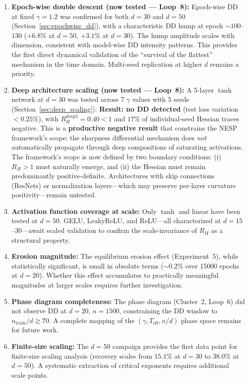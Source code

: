 \documentclass[
  journal=largetwo,
  simfonts=false,
  year=2025,
  volume=37,
]{cup-journal}
\begin{document}
\begin{enumerate}
    \item \textbf{Epoch-wise double descent (now tested --- Loop~8):} Epoch-wise DD at fixed $\gamma=1.2$ was confirmed for both $d=30$ and $d=50$ (Section~\ref{sec:epochwise_dd}), with a characteristic DD hump at epoch $\sim 100$--$130$ ($+6.8\%$ at $d=50$, $+3.1\%$ at $d=30$). The hump amplitude scales with dimension, consistent with model-wise DD intensity patterns. This provides the first direct dynamical validation of the ``survival of the flattest'' mechanism in the time domain. Multi-seed replication at higher $d$ remains a priority.

    \item \textbf{Deep architecture scaling (now tested --- Loop~8):} A 5-layer $\tanh$ network at $d=30$ was tested across 7 $\gamma$ values with 5 seeds (Section~\ref{sec:deep_scaling}). \textbf{Result: no DD detected} (test loss variation $<0.25\%$), with $R_H^{\mathrm{deep5}} = 0.40 < 1$ and $17\%$ of individual-seed Hessian traces negative. This is a \textbf{productive negative result} that constrains the NESP framework's scope: the sharpness differential mechanism does \emph{not} automatically propagate through deep compositions of saturating activations. The framework's scope is now defined by two boundary conditions: (i) $R_H > 1$ must naturally emerge, and (ii) the Hessian must remain predominantly positive-definite. Architectures with skip connections (ResNets) or normalization layers---which may preserve per-layer curvature positivity---remain untested.

    \item \textbf{Activation function coverage at scale:} Only $\tanh$ and linear have been tested at $d=50$. GELU, LeakyReLU, and ReLU---all characterized at $d=15$--$30$---await scaled validation to confirm the scale-invariance of $R_H$ as a structural property.

    \item \textbf{Erosion magnitude:} The equilibrium erosion effect (Experiment~5), while statistically significant, is small in absolute terms ($\sim 0.2\%$ over 15000 epochs at $d=20$). Whether this effect accumulates to practically meaningful magnitudes at larger scales requires further investigation.

    \item \textbf{Phase diagram completeness:} The phase diagram (Cluster~2, Loop~6) did not observe DD at $d=20$, $n=1500$, constraining the DD window to $n_{\mathrm{train}}/d \gtrsim 70$. A complete mapping of the $(\gamma, T_{\mathrm{eff}}, n/d)$ phase space remains for future work.

    \item \textbf{Finite-size scaling:} The $d=50$ campaign provides the first data point for finite-size scaling analysis (recovery scales from $15.1\%$ at $d=30$ to $38.0\%$ at $d=50$). A systematic extraction of critical exponents requires additional scale points.
\end{enumerate}
\end{document}
